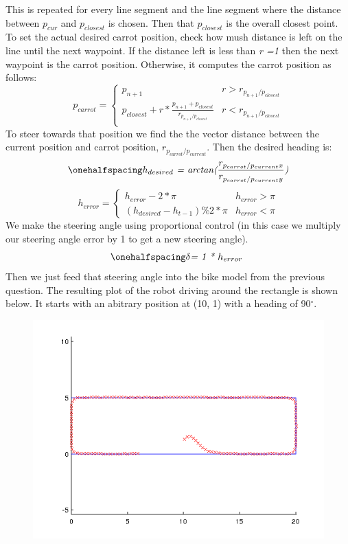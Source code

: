 \documentclass[12pt]{article}
\begin{document}
This is repeated for every line segment and the line segment where the distance between $p_{cur}$ and $p_{closest}$ is chosen. Then that $p_{closest}$ is the overall closest point. To set the actual desired carrot position, check how mush distance is left on the line until the next waypoint. If the distance left is less than \textit{r =1} then the next waypoint is the carrot position. Otherwise, it computes the carrot position as follows:
\[ 
      p_{carrot} = 
      \begin{cases} 
      p_{n+1} & r > r_{p_{n+1}/p_{closest}}\\
      p_{closest} + r * \frac{p_{n+1} + p_{closest}}{r_{p_{n+1}/p_{closest}}} & r < r_{p_{n+1}/p_{closest}} \\
   \end{cases}
\]
To steer towards that position we find the the vector distance between the current position and carrot position, \textit{$r_{p_{carrot}/p_{current}}$}. Then the desired heading is:
 \begin{equation}
\onehalfspacing
\centering
\emph{$h_{desired}$ = arctan($\frac{r_{p_{carrot}/p_{current}x}}{r_{p_{carrot}/p_{current}y}}$)}
\end{equation}
\[ 
      h_{error} = 
      \begin{cases} 
      h_{error} - 2*\pi & h_{error} > \pi \\
      (h_{desired} - h_{t-1}) \% 2*\pi & h_{error} < \pi
   \end{cases}
\]
We make the steering angle using proportional control (in this case we multiply our steering angle error by 1 to get a new steering angle).
\begin{equation}
\onehalfspacing
\centering
\emph{$\delta$= 1 * $h_{error}$ }
\end{equation}
Then we just feed that steering angle into the bike model from the previous question.
The resulting plot of the robot driving around the rectangle is shown below. It starts with an abitrary position at (10, 1) with a heading of 90$^\circ$.
\begin{figure}[ht]
\hspace{0.5cm}
\centering
\includegraphics[scale=0.5]{Pictures/carrot.png}
\end{figure}


 
\end{document}
